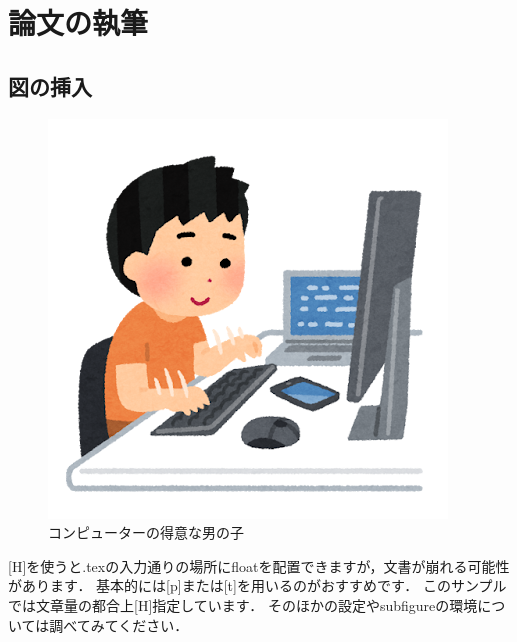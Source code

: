 \documentclass[a4paper, 11pt]{report}
\begin{document}

\chapter{論文の執筆}
\section{図の挿入}
\begin{figure}[H]
    \centering
    \includegraphics[width=0.8\linewidth]{./img/chap2/computer_tokui_boy.png}
    \caption{コンピューターの得意な男の子}
    \label{fig_pcboy}
\end{figure}
[H]を使うと.texの入力通りの場所にfloatを配置できますが，文書が崩れる可能性があります．
基本的には[p]または[t]を用いるのがおすすめです．
このサンプルでは文章量の都合上[H]指定しています．
そのほかの設定やsubfigureの環境については調べてみてください．
\end{document}
